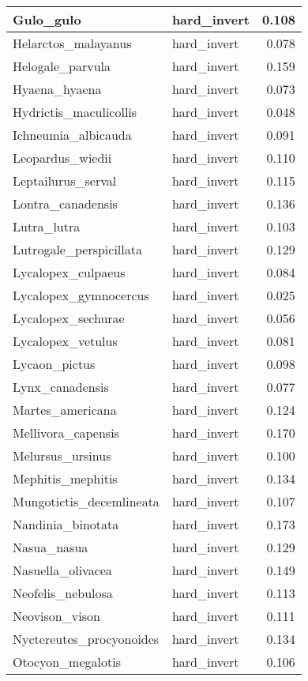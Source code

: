 \begin{table}
\begin{tabular}[t]{l|l|r}
\hline
Gulo\_gulo & hard\_invert & 0.108\\
\hline
Helarctos\_malayanus & hard\_invert & 0.078\\
\hline
Helogale\_parvula & hard\_invert & 0.159\\
\hline
Hyaena\_hyaena & hard\_invert & 0.073\\
\hline
Hydrictis\_maculicollis & hard\_invert & 0.048\\
\hline
Ichneumia\_albicauda & hard\_invert & 0.091\\
\hline
Leopardus\_wiedii & hard\_invert & 0.110\\
\hline
Leptailurus\_serval & hard\_invert & 0.115\\
\hline
Lontra\_canadensis & hard\_invert & 0.136\\
\hline
Lutra\_lutra & hard\_invert & 0.103\\
\hline
Lutrogale\_perspicillata & hard\_invert & 0.129\\
\hline
Lycalopex\_culpaeus & hard\_invert & 0.084\\
\hline
Lycalopex\_gymnocercus & hard\_invert & 0.025\\
\hline
Lycalopex\_sechurae & hard\_invert & 0.056\\
\hline
Lycalopex\_vetulus & hard\_invert & 0.081\\
\hline
Lycaon\_pictus & hard\_invert & 0.098\\
\hline
Lynx\_canadensis & hard\_invert & 0.077\\
\hline
Martes\_americana & hard\_invert & 0.124\\
\hline
Mellivora\_capensis & hard\_invert & 0.170\\
\hline
Melursus\_ursinus & hard\_invert & 0.100\\
\hline
Mephitis\_mephitis & hard\_invert & 0.134\\
\hline
Mungotictis\_decemlineata & hard\_invert & 0.107\\
\hline
Nandinia\_binotata & hard\_invert & 0.173\\
\hline
Nasua\_nasua & hard\_invert & 0.129\\
\hline
Nasuella\_olivacea & hard\_invert & 0.149\\
\hline
Neofelis\_nebulosa & hard\_invert & 0.113\\
\hline
Neovison\_vison & hard\_invert & 0.111\\
\hline
Nyctereutes\_procyonoides & hard\_invert & 0.134\\
\hline
Otocyon\_megalotis & hard\_invert & 0.106\\

\end{tabular}
\end{table}
